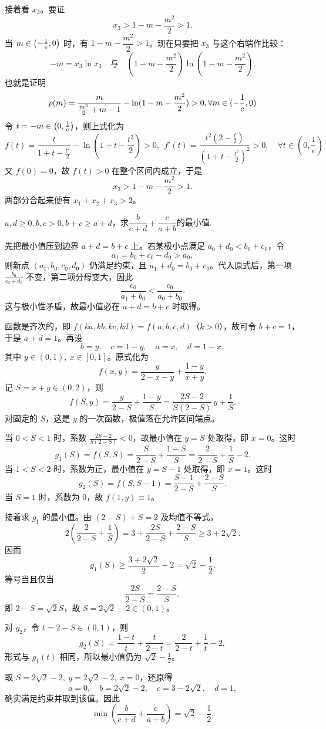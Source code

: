\begin{solution}
接着看 $x_3$。要证
\[
x_3>1-m-\frac{m^2}2>1.
\]
当 $m\in\left(-\frac1{\mathrm{e}},0\right)$ 时，有 $1-m-\dfrac{m^2}{2}>1$。现在只要把 $x_3$ 与这个右端作比较：
\[
-m=x_3\ln x_3
\quad\text{与}\quad
\left(1-m-\frac{m^2}{2}\right)\ln\left(1-m-\frac{m^2}{2}\right).
\]
也就是证明
\[p(m)=\frac{m}{\frac{m^2}2+m-1}-\ln (1-m-\frac{m^2}2)>0,\forall m\in(-\frac1{\mathrm{e}},0)\]
令 $t=-m\in\left(0,\frac1{\mathrm{e}}\right)$，则上式化为
$$f(t)=\frac{t}{1+t-\frac{t^{2}}{2}}-\ln \left(1+t-\frac{t^{2}}{2}\right)>0,~~f'(t)=\frac{t^{2}\left(2-\frac{t}{2}\right)}{\left(1+t-\frac{t^{2}}{2}\right)^{2}}>0, \quad \forall t\in\left(0,\frac{1}{e}\right)$$
又 $f(0)=0$，故 $f(t)>0$ 在整个区间内成立，于是
\[
x_3>1-m-\frac{m^2}2>1.
\]
两部分合起来便有 $x_1+x_2+x_3>2$。
\end{solution}

\newpage
\newpage
\begin{example}
    $a,d\geq 0,b,c>0,b+c\geq a+d$，求$\dfrac{b}{c+d}+\dfrac{c}{a+b}$的最小值.
\end{example}
\begin{solution}
    先把最小值压到边界 $a+d=b+c$ 上。若某极小点满足 $a_0+d_0<b_0+c_0$，令
    \[
    a_1=b_0+c_0-d_0>a_0,
    \]
    则新点 $(a_1,b_0,c_0,d_0)$ 仍满足约束，且 $a_1+d_0=b_0+c_0$。代入原式后，第一项 $\frac{b_0}{c_0+d_0}$ 不变，第二项分母变大，因此
    \[
    \frac{c_0}{a_1+b_0}<\frac{c_0}{a_0+b_0}.
    \]
    这与极小性矛盾，故最小值必在 $a+d=b+c$ 时取得。
    
    函数是齐次的，即 $f(ka,kb,kc,kd)=f(a,b,c,d)$（$k>0$），故可令 $b+c=1$，于是 $a+d=1$。再设
    \[
    b=y,\quad c=1-y,\quad a=x,\quad d=1-x,
    \]
    其中 $y\in(0,1),\ x\in[0,1]$。原式化为
    \[
    f(x,y)=\frac{y}{2-x-y}+\frac{1-y}{x+y}.
    \]
    记 $S=x+y\in(0,2)$，则
    \[
    f(S,y)=\frac{y}{2-S}+\frac{1-y}{S}
    =\frac{2S-2}{S(2-S)}\,y+\frac1S.
    \]
    对固定的 $S$，这是 $y$ 的一次函数，极值落在允许区间端点。

    当 $0<S<1$ 时，系数 $\frac{2S-2}{S(2-S)}<0$，故最小值在 $y=S$ 处取得，即 $x=0$。这时
    \[
    g_1(S)=f(S,S)=\frac{S}{2-S}+\frac{1-S}{S}=\frac{2}{2-S}+\frac1S-2.
    \]
    当 $1<S<2$ 时，系数为正，最小值在 $y=S-1$ 处取得，即 $x=1$。这时
    \[
    g_2(S)=f(S,S-1)=\frac{S-1}{2-S}+\frac{2-S}{S}.
    \]
    当 $S=1$ 时，系数为 $0$，故 $f(1,y)\equiv1$。

    接着求 $g_1$ 的最小值。由 $(2-S)+S=2$ 及均值不等式，
    \[
    2\left(\frac{2}{2-S}+\frac1S\right)
    =3+\frac{2S}{2-S}+\frac{2-S}{S}
    \ge 3+2\sqrt2.
    \]
    因而
    \[
    g_1(S)\ge \frac{3+2\sqrt2}{2}-2=\sqrt2-\frac12.
    \]
    等号当且仅当
    \[
    \frac{2S}{2-S}=\frac{2-S}{S},
    \]
    即 $2-S=\sqrt2S$，故 $S=2\sqrt2-2\in(0,1)$。

    对 $g_2$，令 $t=2-S\in(0,1)$，则
    \[
    g_2(S)=\frac{1-t}{t}+\frac{t}{2-t}
    =\frac{2}{2-t}+\frac1t-2,
    \]
    形式与 $g_1(t)$ 相同，所以最小值仍为 $\sqrt2-\frac12$。

    取 $S=2\sqrt2-2,\ y=2\sqrt2-2,\ x=0$，还原得
    \[
    a=0,\quad b=2\sqrt2-2,\quad c=3-2\sqrt2,\quad d=1,
    \]
    确实满足约束并取到该值。因此
    \[
    \min\left(\frac{b}{c+d}+\frac{c}{a+b}\right)=\sqrt2-\frac12.
    \]
\end{solution}
